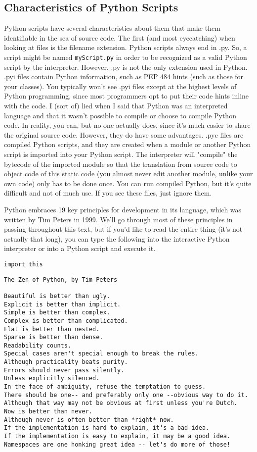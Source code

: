 \subsection{Characteristics of Python Scripts}
Python scripts have several characteristics about them that make them identifiable in the sea of source code. The first (and most eyecatching) when looking at files is the filename extension. Python scripts always end in .py. So, a script might be named \verb|myScript.py| in order to be recognized as a valid Python script by the interpreter. However, .py is not the only extension used in Python. .pyi files contain Python information, such as PEP 484 hints (such as those for your classes). You typically won't see .pyi files except at the highest levels of Python programming, since most programmers opt to put their code hints inline with the code.
I (sort of) lied when I said that Python was an interpreted language and that it wasn't possible to compile or choose to compile Python code. In reality, you can, but no one actually does, since it's much easier to share the original source code. However, they do have some advantages. .pyc files are compiled Python scripts, and they are created when a module or another Python script is imported into your Python script. The interpreter will "compile" the bytecode of the imported module so that the translation from source code to object code of this static code (you almost never edit another module, unlike your own code) only has to be done once. You can run compiled Python, but it's quite difficult and not of much use. If you see these files, just ignore them.\par
Python embraces 19 key principles for development in its language, which was written by Tim Peters in 1999. We'll go through most of these principles in passing throughout this text, but if you'd like to read the entire thing (it's not actually that long), you can type the following into the interactive Python interpreter or into a Python script and execute it.
\begin{lstlisting}[style=pippython]
import this
\end{lstlisting}
\begin{lstlisting}[style=none]
The Zen of Python, by Tim Peters

Beautiful is better than ugly.
Explicit is better than implicit.
Simple is better than complex.
Complex is better than complicated.
Flat is better than nested.
Sparse is better than dense.
Readability counts.
Special cases aren't special enough to break the rules.
Although practicality beats purity.
Errors should never pass silently.
Unless explicitly silenced.
In the face of ambiguity, refuse the temptation to guess.
There should be one-- and preferably only one --obvious way to do it.
Although that way may not be obvious at first unless you're Dutch.
Now is better than never.
Although never is often better than *right* now.
If the implementation is hard to explain, it's a bad idea.
If the implementation is easy to explain, it may be a good idea.
Namespaces are one honking great idea -- let's do more of those!
\end{lstlisting}

